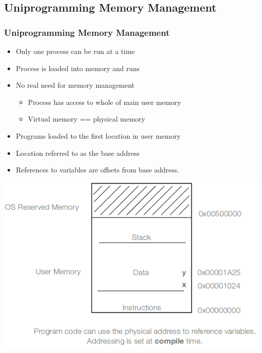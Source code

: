 \documentclass{beamer}
\begin{document}
\subsection{Uniprogramming Memory Management}
\begin{frame}
\frametitle{Uniprogramming Memory Management}
\begin{itemize}
\item Only one process can be run at a time
\item Process is loaded into memory and runs
\item No real need for memory management
\begin{itemize}
\item Process has access to whole of main user memory
\item Virtual memory == physical memory
\end{itemize}
\item Programs loaded to the first location in user memory
\item Location referred to as the base address
\item References to variables are offsets from base address.
\end{itemize}
\includegraphics[scale=0.3]{uni.png}
\end{frame}
\end{document}
